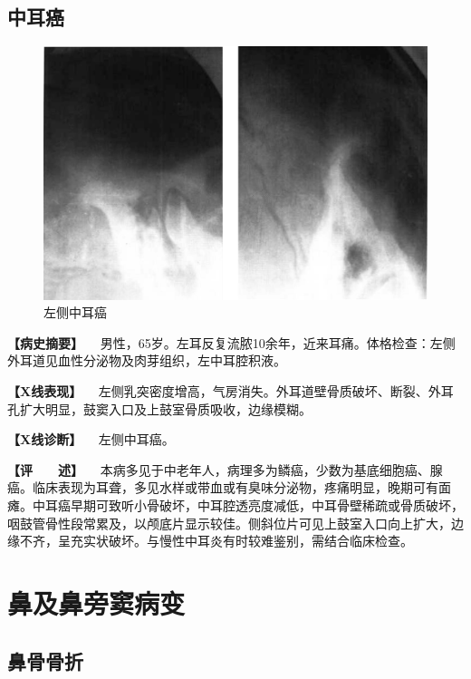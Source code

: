 \subsection{中耳癌}

\begin{figure}[!htbp]
 \centering
 \includegraphics{./images/Image00426.jpg}
 \captionsetup{justification=centering}
 \caption{左侧中耳癌}
 \label{fig7-3-3}
  \end{figure} 

\textbf{【病史摘要】}
　男性，65岁。左耳反复流脓10余年，近来耳痛。体格检查：左侧外耳道见血性分泌物及肉芽组织，左中耳腔积液。

\textbf{【X线表现】}
　左侧乳突密度增高，气房消失。外耳道壁骨质破坏、断裂、外耳孔扩大明显，鼓窦入口及上鼓室骨质吸收，边缘模糊。

\textbf{【X线诊断】} 　左侧中耳癌。

\textbf{【评　　述】}
　本病多见于中老年人，病理多为鳞癌，少数为基底细胞癌、腺癌。临床表现为耳聋，多见水样或带血或有臭味分泌物，疼痛明显，晚期可有面瘫。中耳癌早期可致听小骨破坏，中耳腔透亮度减低，中耳骨壁稀疏或骨质破坏，咽鼓管骨性段常累及，以颅底片显示较佳。侧斜位片可见上鼓室入口向上扩大，边缘不齐，呈充实状破坏。与慢性中耳炎有时较难鉴别，需结合临床检查。

\section{鼻及鼻旁窦病变}

\subsection{鼻骨骨折}

